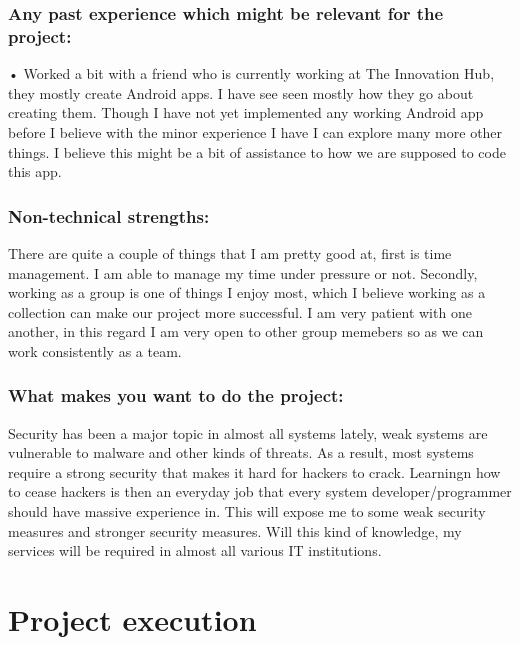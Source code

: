 \documentclass[12pt]{article}
\begin{document}
\begin{description}
	\subsubsection{Any past experience which might be relevant for the project:}
	
	• Worked a bit with a friend who is currently working at The Innovation Hub, they mostly create Android apps. I have see seen mostly how they go about creating them. Though I have not yet implemented any working Android app before I believe with the minor experience I have I can explore many more other things. I believe this might be a bit of assistance to how we are supposed to code this app.
	
	\subsubsection{Non-technical strengths:}
	
	There are quite a couple of things that I am pretty good at, first is time management. I am able to manage my time under pressure or not. Secondly, working as a group is one of things I enjoy most, which I believe working as a collection can make our project more successful. I am very patient with one another, in this regard I am very open to other group memebers so as we can work consistently as a team.
	
	\subsubsection{What makes you want to do the project:}
	
	Security has been a major topic in almost all systems lately, weak systems are vulnerable to malware and other kinds of threats. As a result, most systems require a strong security that makes it hard for hackers to crack. Learningn how to cease hackers is then an everyday job that every system developer/programmer should have massive experience in. This will expose me to some weak security measures and stronger security measures. Will this kind of knowledge, my services will be required in almost all various IT institutions.
	
	
	\end{description}
	

\section{Project execution}
\end{document}
